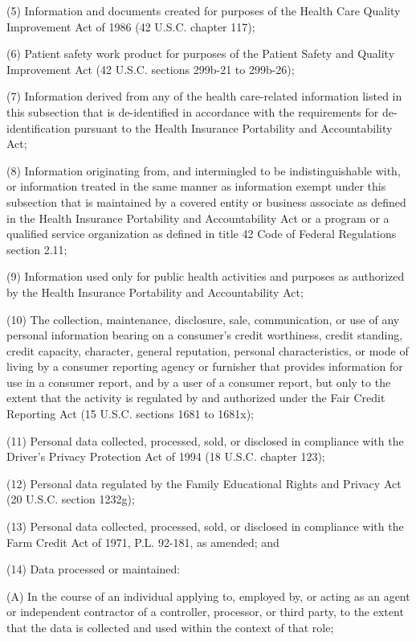      (5)  Information and documents created for purposes of the Health Care Quality Improvement Act of 1986 (42 U.S.C. chapter 117);

     (6)  Patient safety work product for purposes of the Patient Safety and Quality Improvement Act (42 U.S.C. sections 299b-21 to 299b-26);

     (7)  Information derived from any of the health care-related information listed in this subsection that is de-identified in accordance with the requirements for de-identification pursuant to the Health Insurance Portability and Accountability Act;

     (8)  Information originating from, and intermingled to be indistinguishable with, or information treated in the same manner as information exempt under this subsection that is maintained by a covered entity or business associate as defined in the Health Insurance Portability and Accountability Act or a program or a qualified service organization as defined in title 42 Code of Federal Regulations section 2.11;

     (9)  Information used only for public health activities and purposes as authorized by the Health Insurance Portability and Accountability Act;

    (10)  The collection, maintenance, disclosure, sale, communication, or use of any personal information bearing on a consumer's credit worthiness, credit standing, credit capacity, character, general reputation, personal characteristics, or mode of living by a consumer reporting agency or furnisher that provides information for use in a consumer report, and by a user of a consumer report, but only to the extent that the activity is regulated by and authorized under the Fair Credit Reporting Act (15 U.S.C. sections 1681 to 1681x);

    (11)  Personal data collected, processed, sold, or disclosed in compliance with the Driver's Privacy Protection Act of 1994 (18 U.S.C. chapter 123);

    (12)  Personal data regulated by the Family Educational Rights and Privacy Act (20 U.S.C. section 1232g);

    (13)  Personal data collected, processed, sold, or disclosed in compliance with the Farm Credit Act of 1971, P.L. 92-181, as amended; and

    (14)  Data processed or maintained:

          (A)  In the course of an individual applying to, employed by, or acting as an agent or independent contractor of a controller, processor, or third party, to the extent that the data is collected and used within the context of that role;

